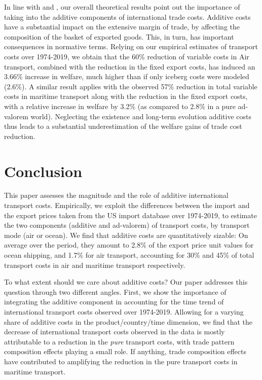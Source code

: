 \documentclass[a4paper,11pt]{article}
\begin{document}
In line with \cite{sorensen2014} and \cite{Irrazabal_2015}, our overall theoretical results point out the importance of taking into the additive components of international trade costs. Additive costs have a substantial impact on the extensive margin of trade, by affecting the composition of the basket of exported goods. This, in turn, has important consequences in normative terms. Relying on our empirical estimates of transport costs over 1974-2019, we obtain that the 60\% reduction of variable costs in Air transport, combined with the reduction in the fixed export costs, has induced an 3.66\% increase in welfare, much higher than if only iceberg costs were modeled (2.6\%). A similar result applies with the observed 57\% reduction in total variable costs in maritime transport along with the reduction in the fixed export costs, with a relative increase in welfare by 3.2\% (as compared to 2.8\% in a pure ad-valorem world). Neglecting the existence and long-term evolution additive costs thus leads to a substantial underestimation of the welfare gains of trade cost reduction.


\section{Conclusion \label{sec:conclu}}

This paper assesses the magnitude and the role of additive international transport costs. Empirically, we exploit the differences between the import and the export prices taken from the US import database over 1974-2019, to estimate the two components (additive and ad-valorem) of transport costs, by transport mode (air or ocean). We find that additive costs are quantitatively sizable: On average over the period, they amount to 2.8\% of the export price unit values for ocean shipping, and 1.7\% for air transport, accounting for 30\% and 45\% of total transport costs in air and maritime transport respectively.

To what extent should we care about additive costs? Our paper addresses this question through two different angles. First, we show the importance of integrating the additive component in accounting for the time trend of international transport costs observed over 1974-2019. Allowing for a varying share of additive costs in the product/country/time dimension, we find that the decrease of international transport costs observed in the data is mostly attributable to a reduction in the \textit{pure} transport costs, with trade pattern composition effects playing a small role. If anything, trade composition effects have contributed to amplifying the reduction in the pure transport costs in maritime transport.
\end{document}
